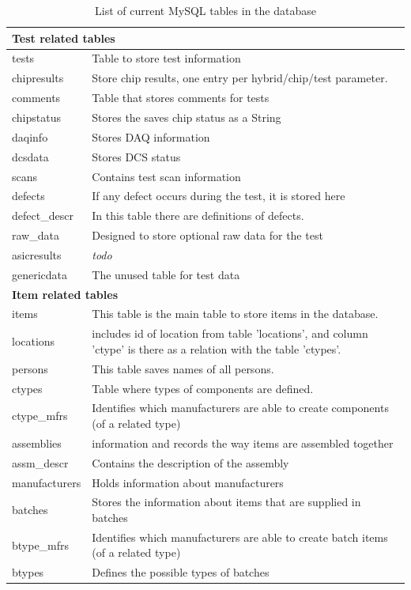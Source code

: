 \begin{longtable}{|p{4cm}|p{10cm}|}
	\caption{List of current MySQL tables in the database\label{tab:mysqlTables}}\\
	
		\multicolumn{2}{l}{\textbf{Test related tables}} \\ \hline
		tests & Table to store test information \\ \hline
		chipresults & Store chip results, one entry per hybrid/chip/test parameter.\\ \hline
		comments & Table that stores comments for tests\\ \hline
		chipstatus & Stores the saves chip status as a String \\ \hline
		daqinfo & Stores DAQ information\\ \hline
		dcsdata & Stores DCS status\\ \hline
		scans & Contains test scan information\\ \hline
		defects & If any defect occurs during the test, it is stored here\\ \hline
		defect\_descr & In this table there are definitions of defects.\\ \hline
		raw\_data & Designed to store optional raw data for the test\\ \hline
		asicresults & \emph{todo} \\ \hline  %
		genericdata & The unused table for test data\\ \hline
				
		\multicolumn{2}{l}{\textbf{Item related tables}} \\ \hline
		items & This table is the main table to store items in the database. \\ \hline
		locations &  includes id of location from table 'locations', and column 'ctype' is there as a relation with the table 'ctypes'.\\ \hline
		persons & This table saves names of all persons.\\ \hline
		ctypes & Table where types of components are defined.\\ \hline
		ctype\_mfrs &  Identifies which manufacturers are able to create components (of a related type)\\ \hline
		assemblies & information and records the way items are assembled together\\ \hline
		assm\_descr & Contains the description of the assembly\\ \hline
		manufacturers & Holds information about manufacturers\\ \hline
		batches & Stores the information about items that are supplied in batches \\ \hline
		btype\_mfrs & Identifies which manufacturers are able to create batch items (of a related type)\\ \hline
		btypes & Defines the possible types of batches\\ \hline


\end{longtable}
